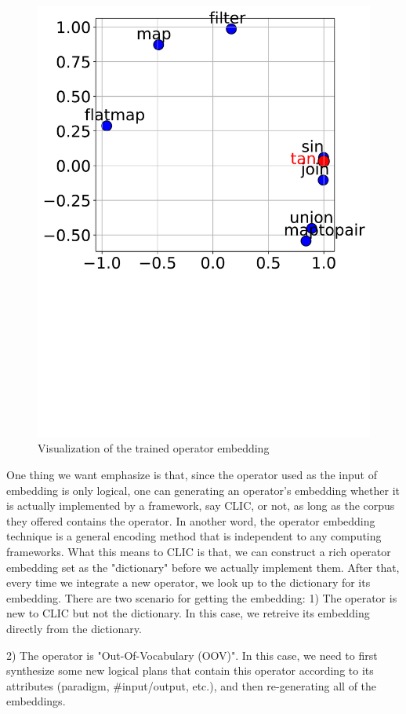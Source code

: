 \begin{figure}[tbh]
  \centering
  \includegraphics[width=0.6\linewidth]{figures/embedding_visual.pdf}
  \caption{Visualization of the trained operator embedding}
  \label{fig:emb_visual}
\end{figure}

One thing we want emphasize is that,  
since the operator used as the input of embedding is only logical,
one can generating an operator's embedding whether it is actually implemented by a framework, say CLIC, or not, 
as long as the corpus they offered contains the operator.
In another word, the operator embedding technique is a general encoding method that is independent to any computing frameworks.
What this means to CLIC is that, we can construct a rich operator embedding set as the "dictionary" before we actually implement them.
After that, every time we integrate a new operator, we look up to the dictionary for its embedding. There are two scenario for getting the embedding:
1) The operator is new to CLIC but not the dictionary. In this case, we retreive its embedding directly from the dictionary.

2) The operator is "Out-Of-Vocabulary (OOV)". In this case, we need to first synthesize some new logical plans that contain this operator according to its attributes (paradigm, \#input/output, etc.), and then re-generating all of the embeddings.


